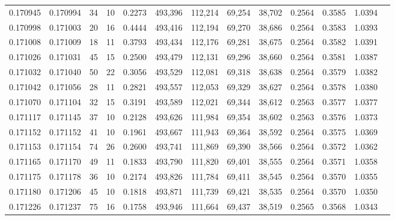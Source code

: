 \begin{tabular}{rrrrrrrrrrrrr}
0.170945 & 0.170994 &    34 &  10 &                                     0.2273 & 493,396 & 112,214 &  69,254 &  38,702 & 0.2564 & 0.3585 & 1.0394 \\
0.170998 & 0.171003 &    20 &  16 &                                     0.4444 & 493,416 & 112,194 &  69,270 &  38,686 & 0.2564 & 0.3583 & 1.0393 \\
0.171008 & 0.171009 &    18 &  11 &                                     0.3793 & 493,434 & 112,176 &  69,281 &  38,675 & 0.2564 & 0.3582 & 1.0391 \\
0.171026 & 0.171031 &    45 &  15 &                                     0.2500 & 493,479 & 112,131 &  69,296 &  38,660 & 0.2564 & 0.3581 & 1.0387 \\
0.171032 & 0.171040 &    50 &  22 &                                     0.3056 & 493,529 & 112,081 &  69,318 &  38,638 & 0.2564 & 0.3579 & 1.0382 \\
0.171042 & 0.171056 &    28 &  11 &                                     0.2821 & 493,557 & 112,053 &  69,329 &  38,627 & 0.2564 & 0.3578 & 1.0380 \\
0.171070 & 0.171104 &    32 &  15 &                                     0.3191 & 493,589 & 112,021 &  69,344 &  38,612 & 0.2563 & 0.3577 & 1.0377 \\
0.171117 & 0.171145 &    37 &  10 &                                     0.2128 & 493,626 & 111,984 &  69,354 &  38,602 & 0.2563 & 0.3576 & 1.0373 \\
0.171152 & 0.171152 &    41 &  10 &                                     0.1961 & 493,667 & 111,943 &  69,364 &  38,592 & 0.2564 & 0.3575 & 1.0369 \\
0.171153 & 0.171154 &    74 &  26 &                                     0.2600 & 493,741 & 111,869 &  69,390 &  38,566 & 0.2564 & 0.3572 & 1.0362 \\
0.171165 & 0.171170 &    49 &  11 &                                     0.1833 & 493,790 & 111,820 &  69,401 &  38,555 & 0.2564 & 0.3571 & 1.0358 \\
0.171175 & 0.171178 &    36 &  10 &                                     0.2174 & 493,826 & 111,784 &  69,411 &  38,545 & 0.2564 & 0.3570 & 1.0355 \\
0.171180 & 0.171206 &    45 &  10 &                                     0.1818 & 493,871 & 111,739 &  69,421 &  38,535 & 0.2564 & 0.3570 & 1.0350 \\
0.171226 & 0.171237 &    75 &  16 &                                     0.1758 & 493,946 & 111,664 &  69,437 &  38,519 & 0.2565 & 0.3568 & 1.0343 \\

\end{tabular}
